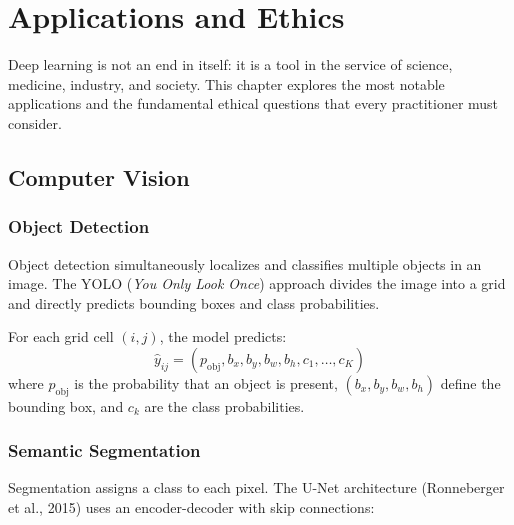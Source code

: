\chapter{Applications and Ethics}
\label{ch:applications}

\begin{intuition}
Deep learning is not an end in itself: it is a tool in the service of science, medicine, industry, and society. This chapter explores the most notable applications and the fundamental ethical questions that every practitioner must consider.
\end{intuition}

\section{Computer Vision}
\label{sec:app_vision}

\subsection{Object Detection}

Object detection simultaneously localizes and classifies multiple objects in an image. The YOLO (\emph{You Only Look Once}) approach divides the image into a grid and directly predicts bounding boxes and class probabilities.

For each grid cell $(i,j)$, the model predicts:
\[
\hat{y}_{ij} = (p_{\mathrm{obj}}, b_x, b_y, b_w, b_h, c_1, \ldots, c_K)
\]
where $p_{\mathrm{obj}}$ is the probability that an object is present, $(b_x, b_y, b_w, b_h)$ define the bounding box, and $c_k$ are the class probabilities.

\subsection{Semantic Segmentation}

Segmentation assigns a class to each pixel. The U-Net architecture (Ronneberger et al., 2015) uses an encoder-decoder with skip connections:

